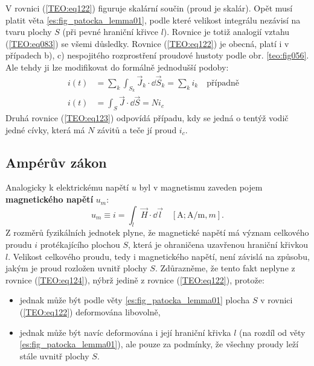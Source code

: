         V rovnici (\ref{TEO:eq122}) figuruje skalární součin (proud je skalár). Opět musí platit
        věta \ref{es:fig_patocka_lemma01}, podle které velikost integrálu nezávisí na tvaru plochy
        \(S\) (při pevné hraniční křivce \(l\)). Rovnice je totiž analogií vztahu (\ref{TEO:eq083})
        se všemi důsledky. Rovnice (\ref{TEO:eq122}) je obecná, platí i v případech b), c)
        nespojitého rozprostření proudové hustoty podle obr. \ref{teo:fig056}. Ale tehdy ji lze
        modifikovat do formálně jednodušší podoby:
        \begin{align}
          i(t) &= \sum_k\int_{S_k}\vec{J}_k\cdot \dd{\vec{S}}_k = \sum_k i_k 
                  \quad\text{případně}\quad                         \nonumber \\
          i(t) &= \int_S\vec{J}\cdot \dd{\vec{S}} = Ni_c                  \label{TEO:eq123}
        \end{align} 
        Druhá rovnice (\ref{TEO:eq123}) odpovídá případu, kdy se jedná o tentýž vodič jedné 
        cívky, která má \(N\) závitů a teče jí proud \(i_c\).
      
      \subsection{Ampérův zákon}
        Analogicky k elektrickému napětí \(u\) byl v magnetismu zaveden pojem \textbf{magnetického 
        napětí} \(u_m\):
        \begin{equation}\label{TEO:eq124}
          u_m \equiv i = \int_l \vec{H}\cdot \dd{\vec{l}} \quad [\si{\A}; \si{\A\per\m}, \si{m}].
        \end{equation} 
        Z rozměrů fyzikálních jednotek plyne, že magnetické napětí má význam celkového proudu \(i\)
        protékajícího plochou \(S\), která je ohraničena uzavřenou hraniční křivkou \(l\). Velikost
        celkového proudu, tedy i magnetického napětí, není závislá na způsobu, jakým je proud
        rozložen uvnitř plochy \(S\). Zdůrazněme, že tento fakt neplyne z rovnice (\ref{TEO:eq124}),
        nýbrž jedině z rovnice (\ref{TEO:eq122}), protože:
        \begin{itemize}         
          \item jednak může být podle věty \ref{es:fig_patocka_lemma01} plocha \(S\) v rovnici 
                (\ref{TEO:eq122}) deformována libovolně,
          \item jednak může být navíc deformována i její hraniční křivka \(l\) (na rozdíl od věty 
                \ref{es:fig_patocka_lemma01}), ale pouze za podmínky, že všechny proudy leží stále 
                uvnitř plochy \(S\).
        \end{itemize}
        
